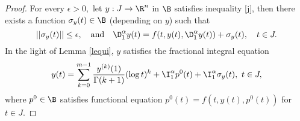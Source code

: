 \begin{proof}
For every $\epsilon>0,$ let $y:{J}\to{\R}^{n}$ in $\B$ satisfies inequality \eqref{j}, then there exists a function $\sigma_y(t)\in\B$ (depending on $y$) such that
\begin{equation*}
||\sigma_y(t)||\leq\epsilon,\quad\text{and}\quad \D_{1}^{\alpha}y(t)=f(t,y(t),{\D_{1}^{\alpha}y(t)})+\sigma_y(t),\quad t\in{J}.
\end{equation*}
In the light of Lemma \ref{lequi}, $y$ satisfies the fractional integral equation
\begin{equation*}
y(t)=\sum_{k=0}^{m-1}\frac{y^{(k)}(1)}{\Gamma(k+1)}(\log{t})^k+{\I_{1}^{\alpha}}p^{0}(t)+{\I_{1}^{\alpha}}\sigma_y(t),\,\, t\in{J},
\end{equation*}
where $p^{0}\in\B$ satisfies functional equation $p^{0}(t)=f(t,y(t),p^{0}(t))$ for $t\in{J}.$


\end{proof}
